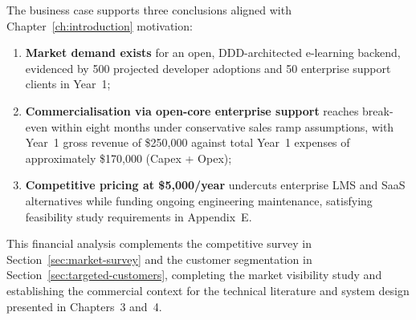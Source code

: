 The business case supports three conclusions aligned with Chapter~\ref{ch:introduction} motivation:
\begin{enumerate}
  \item \textbf{Market demand exists} for an open, DDD-architected e-learning backend, evidenced by 500 projected developer adoptions and 50 enterprise support clients in Year~1;
  \item \textbf{Commercialisation via open-core enterprise support} reaches break-even within eight months under conservative sales ramp assumptions, with Year~1 gross revenue of \$250,000 against total Year~1 expenses of approximately \$170,000 (Capex + Opex);
  \item \textbf{Competitive pricing at \$5,000/year} undercuts enterprise LMS and SaaS alternatives while funding ongoing engineering maintenance, satisfying feasibility study requirements in Appendix~E.
\end{enumerate}

This financial analysis complements the competitive survey in Section~\ref{sec:market-survey} and the customer segmentation in Section~\ref{sec:targeted-customers}, completing the market visibility study and establishing the commercial context for the technical literature and system design presented in Chapters~3 and~4.

